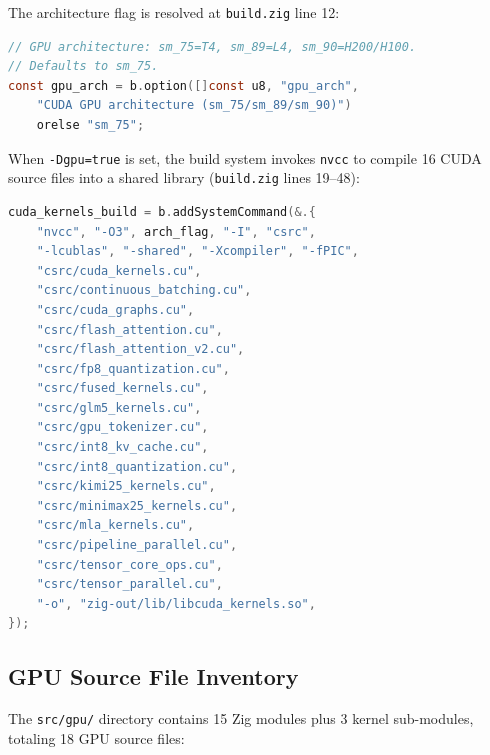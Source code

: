 \documentclass[11pt]{article}
\begin{document}
The architecture flag is resolved at \texttt{build.zig} line 12:

\begin{lstlisting}[language=C,caption={GPU architecture option (build.zig:12)}]
// GPU architecture: sm_75=T4, sm_89=L4, sm_90=H200/H100.
// Defaults to sm_75.
const gpu_arch = b.option([]const u8, "gpu_arch",
    "CUDA GPU architecture (sm_75/sm_89/sm_90)")
    orelse "sm_75";
\end{lstlisting}

When \texttt{-Dgpu=true} is set, the build system invokes \texttt{nvcc} to
compile 16 CUDA source files into a shared library
(\texttt{build.zig} lines 19--48):

\begin{lstlisting}[language=C,caption={CUDA kernel compilation (build.zig:19--48)}]
cuda_kernels_build = b.addSystemCommand(&.{
    "nvcc", "-O3", arch_flag, "-I", "csrc",
    "-lcublas", "-shared", "-Xcompiler", "-fPIC",
    "csrc/cuda_kernels.cu",
    "csrc/continuous_batching.cu",
    "csrc/cuda_graphs.cu",
    "csrc/flash_attention.cu",
    "csrc/flash_attention_v2.cu",
    "csrc/fp8_quantization.cu",
    "csrc/fused_kernels.cu",
    "csrc/glm5_kernels.cu",
    "csrc/gpu_tokenizer.cu",
    "csrc/int8_kv_cache.cu",
    "csrc/int8_quantization.cu",
    "csrc/kimi25_kernels.cu",
    "csrc/minimax25_kernels.cu",
    "csrc/mla_kernels.cu",
    "csrc/pipeline_parallel.cu",
    "csrc/tensor_core_ops.cu",
    "csrc/tensor_parallel.cu",
    "-o", "zig-out/lib/libcuda_kernels.so",
});
\end{lstlisting}

\subsection{GPU Source File Inventory}

The \texttt{src/gpu/} directory contains 15 Zig modules plus 3 kernel sub-modules,
totaling 18 GPU source files:
\end{document}
